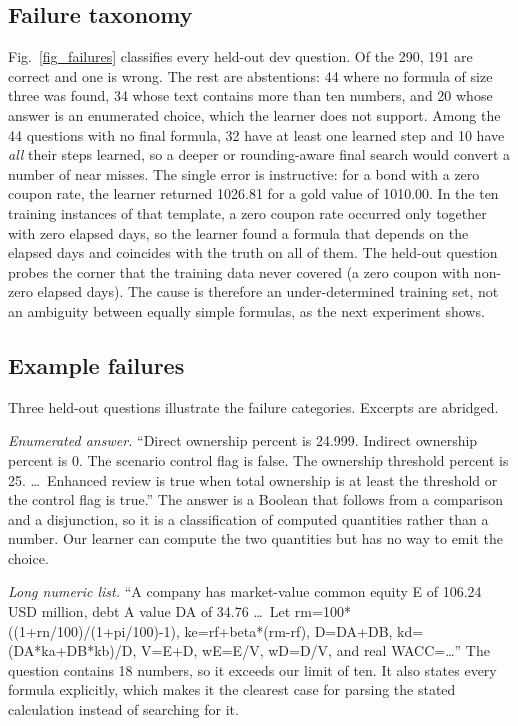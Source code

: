\documentclass[conference]{IEEEtran}
\begin{document}
\subsection{Failure taxonomy}
\label{sub_failures}
Fig.~\ref{fig_failures} classifies every held-out dev question. Of the 290, 191
are correct and one is wrong. The rest are abstentions: 44 where no formula of
size three was found, 34 whose text contains more than ten numbers, and 20 whose
answer is an enumerated choice, which the learner does not support. Among the 44 questions with no final formula, 32 have at least one learned
step and 10 have \emph{all} their steps learned, so a deeper or rounding-aware
final search would convert a number of near misses. The single
error is instructive: for a bond with a zero coupon rate, the learner returned
1026.81 for a gold value of 1010.00. In the ten training instances of that
template, a zero coupon rate occurred only together with zero elapsed days, so
the learner found a formula that depends on the elapsed days and coincides with
the truth on all of them. The held-out question probes the corner that the
training data never covered (a zero coupon with non-zero elapsed days). The
cause is therefore an under-determined training set, not an ambiguity between
equally simple formulas, as the next experiment shows.

\subsection{Example failures}
Three held-out questions illustrate the failure categories. Excerpts are
abridged.

\emph{Enumerated answer.} ``Direct ownership percent is 24.999. Indirect
ownership percent is 0. The scenario control flag is false. The ownership
threshold percent is 25. \dots\ Enhanced review is true when total ownership is
at least the threshold or the control flag is true.'' The answer is a Boolean
that follows from a comparison and a disjunction, so it is a classification of
computed quantities rather than a number. Our learner can compute the two
quantities but has no way to emit the choice.

\emph{Long numeric list.} ``A company has market-value common equity E of
106.24 USD million, debt A value DA of 34.76 \dots\ Let
rm=100*((1+rn/100)/(1+pi/100)-1), ke=rf+beta*(rm-rf), D=DA+DB,
kd=(DA*ka+DB*kb)/D, V=E+D, wE=E/V, wD=D/V, and real WACC=\dots'' The question
contains 18 numbers, so it exceeds our limit of ten. It also states every
formula explicitly, which makes it the clearest case for parsing the stated
calculation instead of searching for it.
\end{document}
